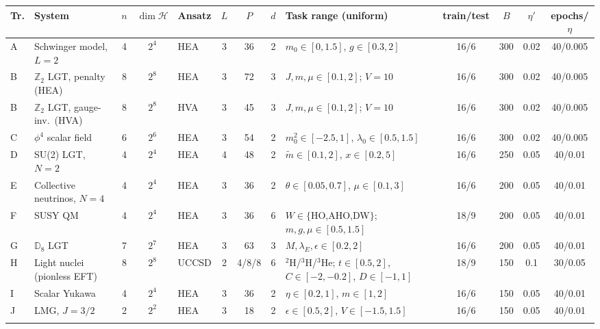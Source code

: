\begin{tabular}{@{}llcclccclcccc@{}}
\toprule
Tr. & System & $n$ & $\dim\mathcal{H}$ & Ansatz & $L$ & $P$ & $d$ & Task range (uniform) & train/test & $B$ & $\eta'$ & epochs/$\eta$ \\
\midrule
A & Schwinger model, $L{=}2$ & 4 & $2^{4}$ & HEA & 3 & 36 & 2 & $m_0\in[0,1.5]$, $g\in[0.3,2]$ & 16/6 & 300 & 0.02 & 40/0.005 \\
B & $\mathbb{Z}_2$ LGT, penalty (HEA) & 8 & $2^{8}$ & HEA & 3 & 72 & 3 & $J,m,\mu\in[0.1,2]$; $V{=}10$ & 16/6 & 300 & 0.02 & 40/0.005 \\
B & $\mathbb{Z}_2$ LGT, gauge-inv.\ (HVA) & 8 & $2^{8}$ & HVA & 3 & 45 & 3 & $J,m,\mu\in[0.1,2]$; $V{=}10$ & 16/6 & 300 & 0.02 & 40/0.005 \\
C & $\phi^4$ scalar field & 6 & $2^{6}$ & HEA & 3 & 54 & 2 & $m_0^2\in[-2.5,1]$, $\lambda_0\in[0.5,1.5]$ & 16/6 & 300 & 0.02 & 40/0.005 \\
D & SU(2) LGT, $N{=}2$ & 4 & $2^{4}$ & HEA & 4 & 48 & 2 & $\tilde m\in[0.1,2]$, $x\in[0.2,5]$ & 16/6 & 250 & 0.05 & 40/0.01 \\
E & Collective neutrinos, $N{=}4$ & 4 & $2^{4}$ & HEA & 3 & 36 & 2 & $\theta\in[0.05,0.7]$, $\mu\in[0.1,3]$ & 16/6 & 200 & 0.05 & 40/0.01 \\
F & SUSY QM & 4 & $2^{4}$ & HEA & 3 & 36 & 6 & $W\in\{$HO,AHO,DW$\}$; $m,g,\mu\in[0.5,1.5]$ & 18/9 & 200 & 0.05 & 40/0.01 \\
G & $\mathbb{D}_8$ LGT & 7 & $2^{7}$ & HEA & 3 & 63 & 3 & $M,\lambda_E,\epsilon\in[0.2,2]$ & 16/6 & 200 & 0.05 & 40/0.01 \\
H & Light nuclei (pionless EFT) & 8 & $2^{8}$ & UCCSD & 2 & 4/8/8 & 6 & $^2$H/$^3$H/$^3$He; $t\in[0.5,2]$, $C\in[-2,-0.2]$, $D\in[-1,1]$ & 18/9 & 150 & 0.1 & 30/0.05 \\
I & Scalar Yukawa & 4 & $2^{4}$ & HEA & 3 & 36 & 2 & $\eta\in[0.2,1]$, $m\in[1,2]$ & 16/6 & 150 & 0.05 & 40/0.01 \\
J & LMG, $J{=}3/2$ & 2 & $2^{2}$ & HEA & 3 & 18 & 2 & $\epsilon\in[0.5,2]$, $V\in[-1.5,1.5]$ & 16/6 & 150 & 0.05 & 40/0.01 \\
\botrule
\end{tabular}
